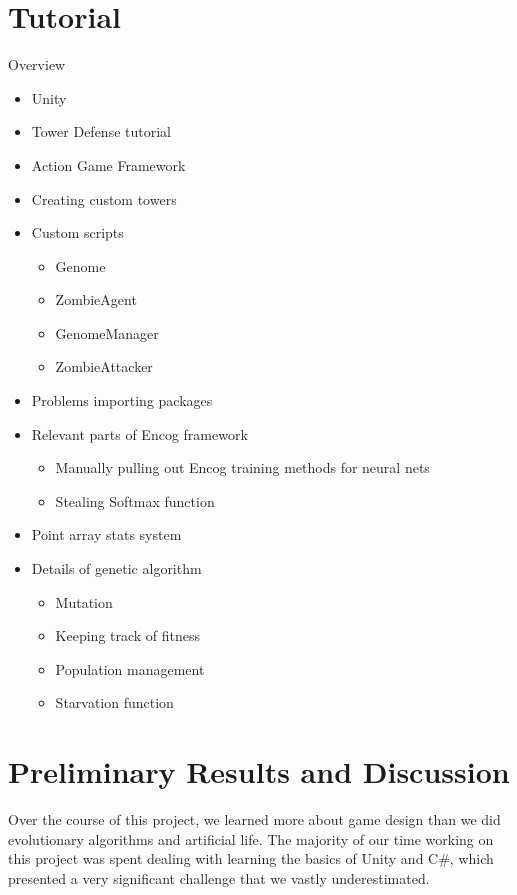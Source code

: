 \documentclass[letterpaper]{article}
\begin{document}
\section{Tutorial}
Overview
\begin{itemize}
    \item Unity
    \item Tower Defense tutorial
    \item Action Game Framework
    \item Creating custom towers
    \item Custom scripts
        \begin{itemize}
            \item Genome
            \item ZombieAgent
            \item GenomeManager
            \item ZombieAttacker
        \end{itemize}
    \item Problems importing packages
    \item Relevant parts of Encog framework
        \begin{itemize}
            \item Manually pulling out Encog training methods for neural nets
            \item Stealing Softmax function
        \end{itemize}
    \item Point array stats system
    \item Details of genetic algorithm
        \begin{itemize}
            \item Mutation
            \item Keeping track of fitness
            \item Population management
            \item Starvation function
        \end{itemize}
\end{itemize}


\section{Preliminary Results and Discussion}
Over the course of this project, we learned more about game design than we did evolutionary algorithms and artificial life. The majority of our time working on this project was spent dealing with learning the basics of Unity and C\#, which presented a very significant challenge that we vastly underestimated.
\end{document}
